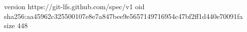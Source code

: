 version https://git-lfs.github.com/spec/v1
oid sha256:aa45962c325500107e8e7a847bee9e5657149716954c47bf2ff1d440e70091fa
size 448
